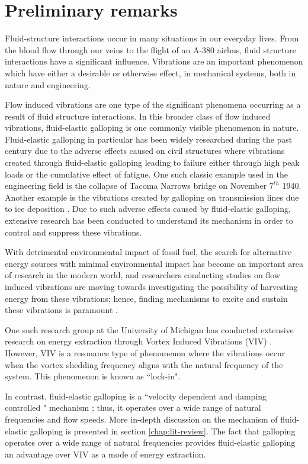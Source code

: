 \chapter{Preliminary remarks}

Fluid-structure interactions occur in many situations in our everyday lives. From the blood flow through our veins to the flight of an A-380 airbus, fluid structure interactions have a significant influence. Vibrations are an important phenomenon which have either a desirable or otherwise effect, in mechanical systems, both in nature and engineering.

Flow induced vibrations are one type of the significant phenomena occurring as a result of fluid structure interactions. In this broader class of flow induced vibrations, fluid-elastic galloping is one commonly visible phenomenon in nature. Fluid-elastic galloping in particular has been widely researched during the past century due to the adverse effects caused on civil structures where vibrations created through fluid-elastic galloping  leading to failure either through high peak loads or the cumulative effect of fatigue. One such classic example used in the engineering field is the collapse of Tacoma Narrows bridge on November $7^{th}$ 1940. Another example is the vibrations created by galloping on transmission lines due to ice deposition \citep{Parkinson1964}. Due to such adverse effects caused by fluid-elastic galloping, extensive research has been conducted to understand its mechanism in order to control and suppress these vibrations.  

With detrimental environmental impact of  fossil fuel, the search for alternative energy sources with minimal environmental impact has become an important area of research in the modern world, and researchers conducting studies on flow induced vibrations are moving towards investigating the possibility of harvesting energy from these vibrations; hence, finding mechanisms to excite and sustain these vibrations is paramount \citep{Barrero-Gil2010a}.  

One such research group at the University of Michigan has conducted extensive research on energy extraction through Vortex Induced Vibrations (VIV) \citep{Bernitsas2008a-concept, Bernitsas2009, Raghavan2010a, Lee2011b}. However, VIV is a resonance type of phenomenon where the vibrations occur when the vortex shedding frequency aligns with the natural frequency of the system. This phenomenon is known as ``lock-in".

In contrast, fluid-elastic galloping is a ``velocity dependent and damping controlled " mechanism \citep{Paidoussis2010}; thus, it operates over a wide range of natural frequencies and flow speeds.  More in-depth discussion on the mechanism of fluid-elastic galloping is presented in section \ref{chap:lit-review}. The fact that galloping operates over a wide range of natural frequencies provides fluid-elastic galloping an advantage over VIV as a mode of energy extraction.

